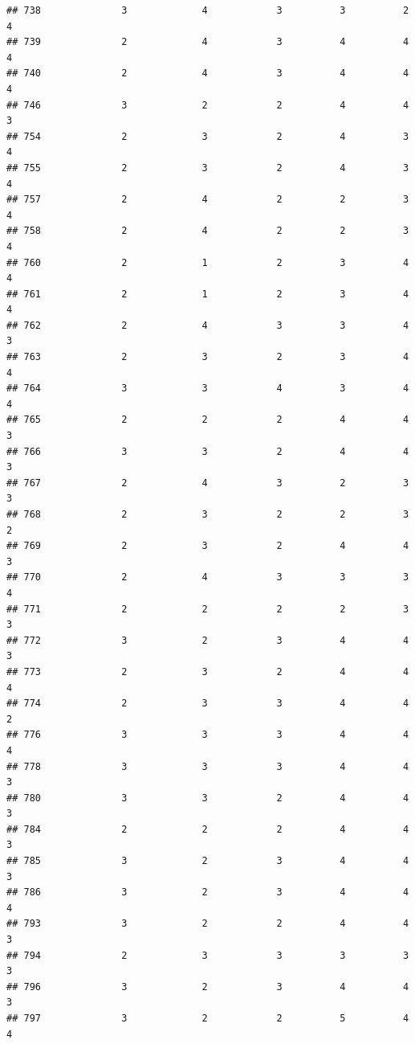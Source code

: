 \documentclass[
]{article}
\begin{document}
\begin{verbatim}
## 738              3             4            3          3          2        4
## 739              2             4            3          4          4        4
## 740              2             4            3          4          4        4
## 746              3             2            2          4          4        3
## 754              2             3            2          4          3        4
## 755              2             3            2          4          3        4
## 757              2             4            2          2          3        4
## 758              2             4            2          2          3        4
## 760              2             1            2          3          4        4
## 761              2             1            2          3          4        4
## 762              2             4            3          3          4        3
## 763              2             3            2          3          4        4
## 764              3             3            4          3          4        4
## 765              2             2            2          4          4        3
## 766              3             3            2          4          4        3
## 767              2             4            3          2          3        3
## 768              2             3            2          2          3        2
## 769              2             3            2          4          4        3
## 770              2             4            3          3          3        4
## 771              2             2            2          2          3        3
## 772              3             2            3          4          4        3
## 773              2             3            2          4          4        4
## 774              2             3            3          4          4        2
## 776              3             3            3          4          4        4
## 778              3             3            3          4          4        3
## 780              3             3            2          4          4        3
## 784              2             2            2          4          4        3
## 785              3             2            3          4          4        3
## 786              3             2            3          4          4        4
## 793              3             2            2          4          4        3
## 794              2             3            3          3          3        3
## 796              3             2            3          4          4        3
## 797              3             2            2          5          4        4

\end{verbatim}
\end{document}
